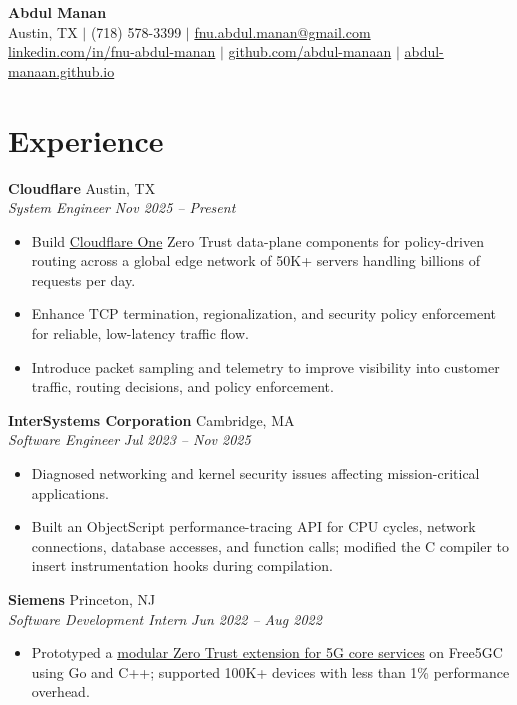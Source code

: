 \documentclass[letterpaper,10pt]{article}
\newcommand{\role}[4]{\textbf{#1} \hfill #2\\\textit{#3} \hfill \textit{#4}\par}
\begin{document}
\begin{center}
{\LARGE\bfseries Abdul Manan}\\[3pt]
Austin, TX $|$ (718) 578-3399 $|$ \href{mailto:fnu.abdul.manan@gmail.com}{fnu.abdul.manan@gmail.com}\\[1pt]
\href{https://www.linkedin.com/in/fnu-abdul-manan}{linkedin.com/in/fnu-abdul-manan} $|$
\href{https://github.com/abdul-manaan}{github.com/abdul-manaan} $|$
\href{https://abdul-manaan.github.io}{abdul-manaan.github.io}
\end{center}
\vspace{-10pt}
\section{Experience}
\role{Cloudflare}{Austin, TX}{System Engineer}{Nov 2025 -- Present}
\begin{itemize}
\item Build \href{https://developers.cloudflare.com/cloudflare-one/}{Cloudflare One} Zero Trust data-plane components for policy-driven routing across a global edge network of 50K+ servers handling billions of requests per day.
\item Enhance TCP termination, regionalization, and security policy enforcement for reliable, low-latency traffic flow.
\item Introduce packet sampling and telemetry to improve visibility into customer traffic, routing decisions, and policy enforcement.
\end{itemize}
\vspace{2pt}
\role{InterSystems Corporation}{Cambridge, MA}{Software Engineer}{Jul 2023 -- Nov 2025}
\begin{itemize}
\item Diagnosed networking and kernel security issues affecting mission-critical applications.
\item Built an ObjectScript performance-tracing API for CPU cycles, network connections, database accesses, and function calls; modified the C compiler to insert instrumentation hooks during compilation.
\end{itemize}
\vspace{2pt}
\role{Siemens}{Princeton, NJ}{Software Development Intern}{Jun 2022 -- Aug 2022}
\begin{itemize}
\item Prototyped a \href{https://doi.org/10.1109/AICCSA56895.2022.10017774}{\underline{modular Zero Trust extension for 5G core services}} on Free5GC using Go and C++; supported 100K+ devices with less than 1\% performance overhead.
\end{itemize}
\end{document}
